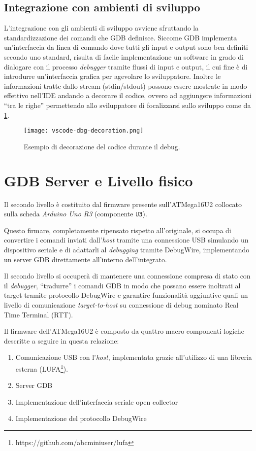 \subsection{Integrazione con ambienti di sviluppo}\label{ss:code-decoration}

L'integrazione con gli ambienti di sviluppo avviene sfruttando la standardizzazione dei comandi che GDB definisce. Siccome GDB implementa un'interfaccia da linea di comando dove tutti gli input e output sono ben definiti secondo uno standard\cite{site:gdbproto}, risulta di facile implementazione un software in grado di dialogare con il processo \textit{debugger} tramite flussi di input e output, il cui fine è di introdurre un'interfaccia grafica per agevolare lo sviluppatore. Inoltre le informazioni tratte dallo stream (stdin/stdout) possono essere mostrate in modo effettivo nell'IDE andando a decorare il codice, ovvero ad aggiungere informazioni ``tra le righe'' permettendo allo sviluppatore di focalizzarsi sullo sviluppo come da \cref{fig:vscode-dbg-dec}.

\begin{figure}[t]
    \centering
    \texttt{[image: vscode-dbg-decoration.png]}
    \caption[]{Esempio di decorazione del codice durante il debug.}\label{fig:vscode-dbg-dec}
\end{figure}

\section{GDB Server e Livello fisico}

Il secondo livello è costituito dal firmware presente sull'ATMega16U2 collocato sulla scheda \textit{Arduino Uno R3} (componente \texttt{U3}).

Questo firmare, completamente ripensato rispetto all'originale, si occupa di convertire i comandi inviati dall'\textit{host} tramite una connessione USB simulando un dispositivo seriale e di adattarli al \textit{debugging} tramite DebugWire, implementando un server GDB direttamente all'interno dell'integrato.

Il secondo livello si occuperà di mantenere una connessione compresa di stato con il \textit{debugger}, ``tradurre'' i comandi GDB in modo che possano essere inoltrati al target tramite protocollo DebugWire e garantire funzionalità aggiuntive quali un livello di comunicazione \textit{target-to-host} su connessione di debug nominato Real Time Terminal (RTT).

Il firmware dell'ATMega16U2 è composto da quattro macro componenti logiche descritte a seguire in questa relazione:
\begin{enumerate}
    \item Comunicazione USB con l'\textit{host}, implementata grazie all'utilizzo di una libreria esterna (LUFA\footnote{https://github.com/abcminiuser/lufa}).
    \item Server GDB
    \item Implementazione dell'interfaccia seriale open collector
    \item Implementazione del protocollo DebugWire
\end{enumerate}

